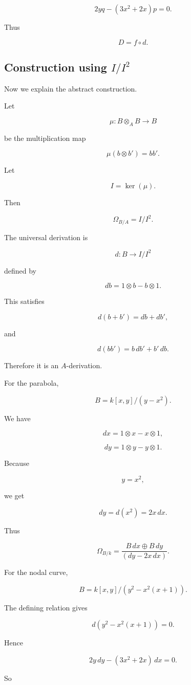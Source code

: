 \documentclass[12pt,a4paper]{article}
\theoremstyle{notespace}
\begin{document}
\[
2yq-(3x^2+2x)p=0.
\]

Thus

\[
D=f\circ d.
\]

\subsection{Construction using \(I/I^2\)}

Now we explain the abstract construction.

Let

\[
\mu:B\otimes_A B\to B
\]

be the multiplication map

\[
\mu(b\otimes b')=bb'.
\]

Let

\[
I=\ker(\mu).
\]

Then

\[
\Omega_{B/A}=I/I^2.
\]

The universal derivation is

\[
d:B\to I/I^2
\]

defined by

\[
db=1\otimes b-b\otimes 1.
\]

This satisfies

\[
d(b+b')=db+db',
\]

and

\[
d(bb')=b\,db'+b'\,db.
\]

Therefore it is an \(A\)-derivation.

For the parabola,

\[
B=k[x,y]/(y-x^2).
\]

We have

\[
dx=1\otimes x-x\otimes 1,
\]

\[
dy=1\otimes y-y\otimes 1.
\]

Because

\[
y=x^2,
\]

we get

\[
dy=d(x^2)=2x\,dx.
\]

Thus

\[
\Omega_{B/k}
=
\frac{B\,dx\oplus B\,dy}{(dy-2x\,dx)}.
\]

For the nodal curve,

\[
B=k[x,y]/(y^2-x^2(x+1)).
\]

The defining relation gives

\[
d(y^2-x^2(x+1))=0.
\]

Hence

\[
2y\,dy-(3x^2+2x)\,dx=0.
\]

So
\end{document}
